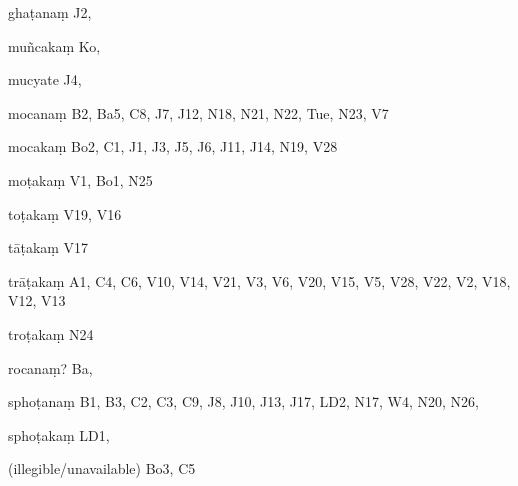 \begin{ekdosis}
\begin{marma}[hp01_055]
\begin{marma}[hp02_009]
\begin{marma}[hp02_011]
      \begin{marma}[hp02_33a]
      \item[ghaṭanaṃ] J2, 
      \item[muñcakaṃ] Ko,
      \item[mucyate] J4,
      \item[mocanaṃ] B2, Ba5, C8, J7, J12, N18, N21, N22, Tue, N23, V7
      \item[mocakaṃ] Bo2, C1, J1, J3, J5, J6, J11, J14, N19, V28
      \item[moṭakaṃ] V1, Bo1, N25 
      \item[toṭakaṃ] V19, V16
      \item[tāṭakaṃ] V17
      \item[trāṭakaṃ] A1, C4, C6, V10, V14, V21, V3, V6, V20, V15, V5, V28, V22, V2, V18, V12, V13
      \item[troṭakaṃ] N24
      \item[rocanaṃ?] Ba,
      \item[sphoṭanaṃ] B1, B3, C2, C3, C9, J8, J10, J13, J17, LD2, N17, W4, N20, N26,  
      \item[sphoṭakaṃ] LD1,
      \item[(illegible/unavailable)] Bo3, C5
        \begin{description}

        \end{description}
      \end{marma}


\end{marma}
\end{marma}
\end{marma}
\end{ekdosis}
